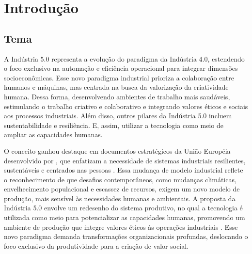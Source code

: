 

\chapter{Introdução}\label{cap:introducao}

\section{Tema}
A Indústria 5.0 representa a evolução do paradigma da Indústria 4.0, estendendo o foco exclusivo na automação e eficiência operacional para integrar dimensões socioeconômicas. Esse novo paradigma industrial prioriza a colaboração entre humanos e máquinas, mas centrada na busca da valorização da criatividade humana. Dessa forma, desenvolvendo ambientes de trabalho mais saudáveis, estimulando o trabalho criativo e colaborativo e integrando valores éticos e sociais aos processos industriais. Além disso, outros pilares da Indústria 5.0 incluem sustentabilidade e resiliência. E, assim, utilizar a tecnologia como meio de ampliar as capacidades humanas.%

O conceito ganhou destaque em documentos estratégicos da União Européia desenvolvido por , que enfatizam a necessidade de sistemas industriais resilientes, sustentáveis e centrados nas pessoas . Essa mudança de modelo industrial reflete o reconhecimento de que desafios contemporâneos, como mudanças climáticas, envelhecimento populacional e escassez de recursos, exigem um novo modelo de produção, mais sensível às necessidades humanas e ambientais. A proposta da Indústria 5.0 envolve um redesenho do sistema produtivo, no qual a tecnologia é utilizada como meio para potencializar as capacidades humanas, promovendo um ambiente de produção que integre valores éticos às operações industriais . Esse novo paradigma demanda transformações organizacionais profundas, deslocando o foco exclusivo da produtividade para a criação de valor social.

